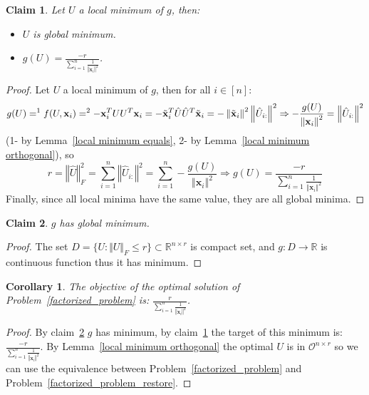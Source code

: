\documentclass{article}
\newtheorem{corollary}{Corollary}
\newtheorem{claim}{Claim}
\newcommand{\probref}[1]{Problem~\ref{#1}}
\newcommand{\claimref}[1]{claim~\ref{#1}}
\newcommand{\Lemmaref}[1]{Lemma~\ref{#1}}
\newcommand{\x}{{\mathbf x}}
\begin{document}
\begin{claim} \label{local minimum is global}
Let $U$ a local minimum of $g$, then: 
\begin{itemize}
    \item $U$ is global minimum.
    \item $g(U)=\frac{-r}{\sum_{i=1}^n \frac{1}{\left\Vert \x_{i}\right\Vert^{2}}}$.
\end{itemize}
\end{claim}

\begin{proof}

Let $U$ a local minimum of $g$, then for all $i\in[n]$:
$$
g(U)=^1f(U,\x_i)=^2-\x_i^TUU^T\x_i=-\Tilde{\x}_i^T\hat{U}\hat{U}^T\Tilde{\x}_i=-\left\Vert\Tilde{\x}_{i}\right\Vert^{2}\left\Vert \hat{U}_{i:}\right\Vert^2\Rightarrow - \frac{g(U)}{\left\Vert\x_{i}\right\Vert^{2}} = \left\Vert \hat{U}_{i:}\right\Vert^2
$$
(1- by \Lemmaref{local minimum equals}, 2- by \Lemmaref{local minimum orthogonal}), so
$$
r=\left\Vert \hat{U}\right\Vert^2_F=\sum_{i=1}^n \left\Vert \hat{U}_{i:}\right\Vert^2=\sum_{i=1}^n - \frac{g(U)}{\left\Vert\x_{i}\right\Vert^{2}}\Rightarrow g(U)= \frac{-r}{\sum_{i=1}^n \frac{1}{\left\Vert\x_{i}\right\Vert^{2}}}
$$
Finally, since all local minima have the same value, they are all global minima.
\end{proof}

\begin{claim} \label{has minimum}
$g$ has global minimum.
\end{claim}

\begin{proof}
    The set $D=\{U:\Vert U\Vert_F\le r\}\subset\mathbb{R}^{n\times r}$ is compact set, and $g:D\rightarrow\mathbb{R}$ is continuous function thus it has minimum. 
\end{proof}

\begin{corollary} \label{tagrget of original problem}
The objective of the optimal solution of \probref{factorized_problem} is: $\frac{r}{\sum_{i=1}^n \frac{1}{\left\Vert\x_{i}\right\Vert^{2}}}$.
\end{corollary}

\begin{proof}
    By \claimref{has minimum} $g$ has minimum, by \claimref{local minimum is global} the target of this minimum is: $\frac{-r}{\sum_{i=1}^n \frac{1}{\left\Vert\x_{i}\right\Vert^{2}}}$. By \Lemmaref{local minimum orthogonal} the optimal $U$ is in $\mathcal{O}^{n\times r}$ so we can use the equivalence between \probref{factorized_problem} and \probref{factorized_problem_restore}.
    
\end{proof}
\end{document}
